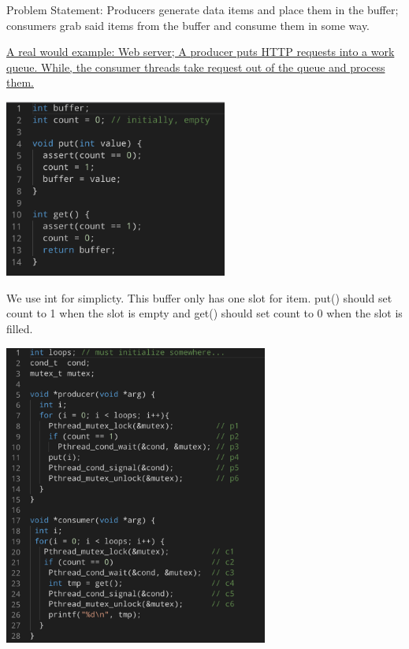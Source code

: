 
    Problem Statement: Producers generate data items and place them in the buffer; consumers grab said items 
    from the buffer and consume them in some way.

    \underline{A real would example: Web server; A producer puts HTTP requests into a work queue. 
    While, the consumer threads
    take request out of the queue and process them.}


    \includegraphics[width=0.55\textwidth]{chapters/Cucurrency/Cucurrency/put_and_get.png}
    
    We use int for simplicty. This buffer only has one slot for item. 
    put() should set count to 1 when the slot is empty and get() should set count to 0 when the slot is filled.

    \vspace*{5mm}


    \includegraphics[width=0.65\textwidth]{chapters/Cucurrency/Cucurrency/pc_broken.png}

